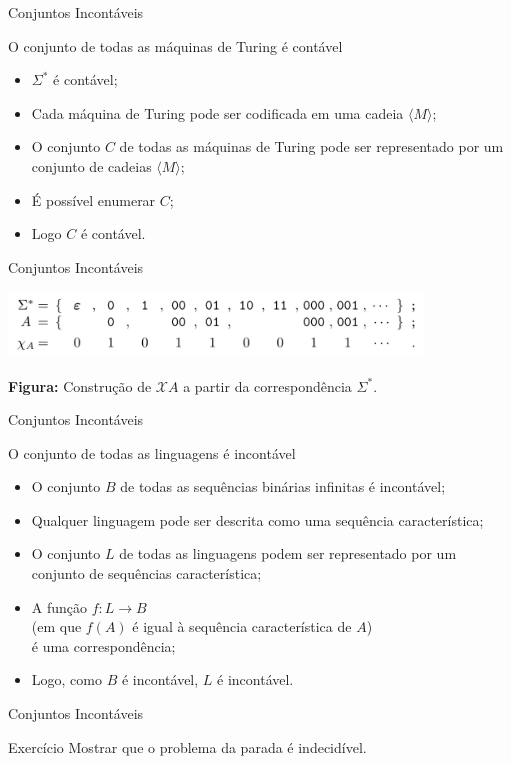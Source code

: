 \documentclass[xcolor=dvipsnames,table]{beamer}
\begin{document}
	\begin{frame}{Conjuntos Incontáveis}
		\begin{block}{O conjunto de todas as máquinas de Turing é contável}
			\begin{itemize}
				\item $\Sigma^*$ é contável; \pause
				\item Cada máquina de Turing pode ser codificada em uma cadeia $\langle M \rangle$; \pause
				\item O conjunto $C$ de todas as máquinas de Turing pode ser representado por um conjunto de cadeias $\langle M \rangle$; \pause
				\item É possível enumerar $C$; \pause
				\item Logo $C$ é contável.
			\end{itemize}
		\end{block}
	\end{frame}

	\begin{frame}{Conjuntos Incontáveis}
		\begin{center}
			\includegraphics[width=11cm]{images/seqCar.png}
			
			{\bf Figura:} Construção de $\mathcal{X}A$ a partir da correspondência $\Sigma^*$.
		\end{center}
	\end{frame}
	
	\begin{frame}{Conjuntos Incontáveis}
		\begin{block}{O conjunto de todas as linguagens é incontável}
			\begin{itemize}
				\item O conjunto $B$ de todas as sequências binárias infinitas é incontável; \pause
				\item Qualquer linguagem pode ser descrita como uma sequência característica; \pause
				\item O conjunto $L$ de todas as linguagens podem ser representado por um conjunto de sequências \pause característica; \pause
				\item A função $f : L \rightarrow B$ \\(em que $f(A)$ é igual à sequência característica de $A$) \\é uma correspondência; \pause
				\item Logo, como $B$ é incontável, $L$ é incontável.
			\end{itemize}
		\end{block}
	\end{frame}
	
	\begin{frame}{Conjuntos Incontáveis}
		\begin{block}{Exercício}
			Mostrar que o problema da parada é indecidível.
		\end{block}
	\end{frame}
	
	\begin{frame}
		\titlepage
	\end{frame}
	
\end{document}
